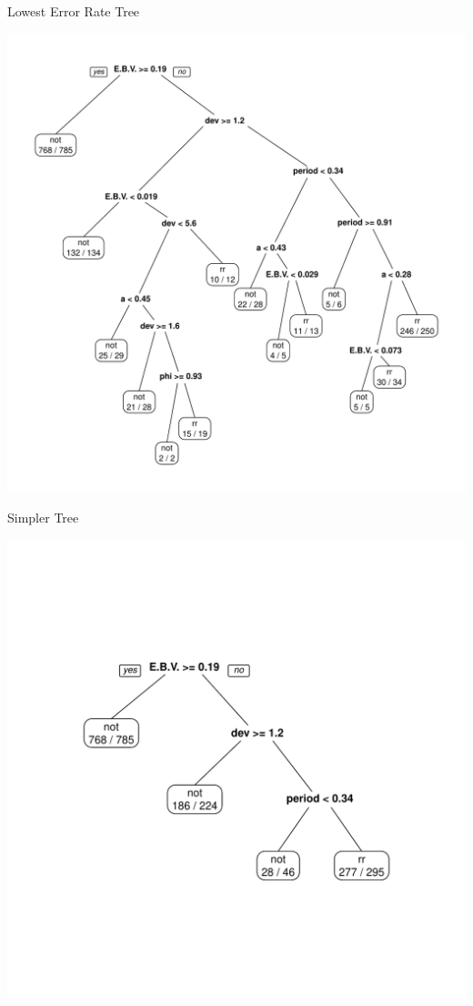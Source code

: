 \documentclass[12pt]{beamer}
\begin{document}
\begin{frame}{Lowest Error Rate Tree}

  \begin{center}
    \includegraphics[scale=0.4]{figs/rpart_pruned.pdf}
    \end{center}
\end{frame}



\begin{frame}{Simpler Tree}
  \vspace{-.5in}
  
  \begin{center}
    \includegraphics[scale=0.6]{figs/rpart_pruned_more.pdf}
    \end{center}
\end{frame}
\end{document}

